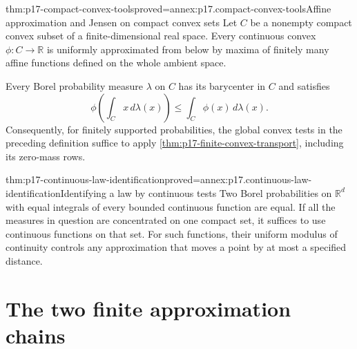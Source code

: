 \begin{hblemma}{thm:p17-compact-convex-tools}{proved=annex:p17.compact-convex-tools}{Affine approximation and Jensen on compact convex sets}
Let \(C\) be a nonempty compact convex subset of a finite-dimensional
real space. Every continuous convex \(\phi:C\to\mathbb R\) is uniformly
approximated from below by maxima of finitely many affine functions
defined on the whole ambient space.

Every Borel probability measure \(\lambda\) on \(C\) has its barycenter
in \(C\) and satisfies
\[
                         \phi\left(\int_Cx\,d\lambda(x)\right)
                                   \leq\int_C\phi(x)\,d\lambda(x).
\]
Consequently, for finitely supported probabilities, the global convex
tests in the preceding definition suffice to apply
\cref{thm:p17-finite-convex-transport}, including its zero-mass rows.
\end{hblemma}

\begin{hblemma}{thm:p17-continuous-law-identification}{proved=annex:p17.continuous-law-identification}{Identifying a law by continuous tests}
Two Borel probabilities on \(\mathbb R^d\) with equal integrals of
every bounded continuous function are equal.
If all the measures in question are concentrated on one compact set,
it suffices to use continuous functions on that set.
For such functions, their uniform modulus of continuity controls any
approximation that moves a point by at most a specified distance.
\end{hblemma}

\section{The two finite approximation chains}
\label{sec:p17-blackwell-approximations}

